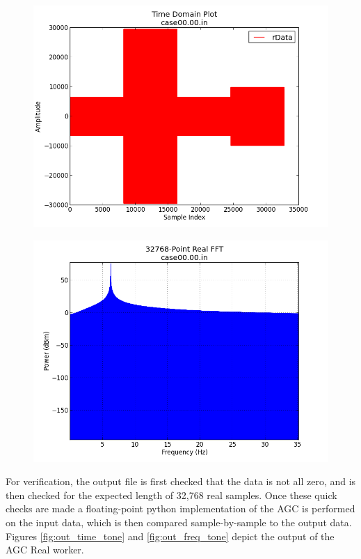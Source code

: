 \documentclass{article}
\begin{document}
	\begin{figure}[ht]
		\centering
		\begin{minipage}{.5\textwidth}
			\centering\includegraphics[width=1.0\linewidth]{input_time}
			\label{fig:in_time_tone}
		\end{minipage}%
		\begin{minipage}{.5\textwidth}
			\centering\includegraphics[width=1.0\linewidth]{input_freq}
			\label{fig:in_freq_tone}
		\end{minipage}
	\end{figure}

\begin{flushleft}
	For verification, the output file is first checked that the data is not all zero, and is then checked for the expected length of 32,768 real samples. Once these quick checks are made a floating-point python implementation of the AGC is performed on the input data, which is then compared sample-by-sample to the output data. Figures \ref{fig:out_time_tone} and \ref{fig:out_freq_tone} depict the output of the AGC Real worker.
\end{flushleft}
\newpage
\end{document}
